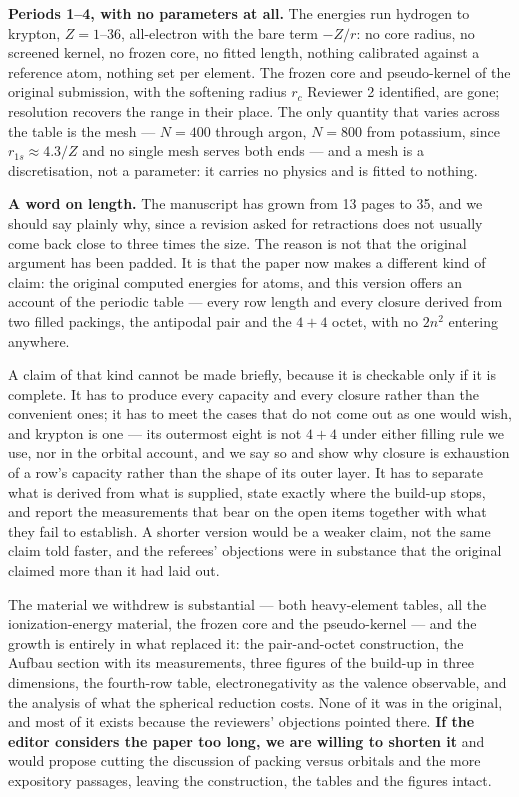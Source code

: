 \documentclass[11pt,a4paper]{article}
\begin{document}
\textbf{Periods 1--4, with no parameters at all.} The energies run hydrogen to krypton, $Z=1$--$36$,
all-electron with the bare term $-Z/r$: no core radius, no screened kernel, no frozen core, no fitted
length, nothing calibrated against a reference atom, nothing set per element. The frozen core and
pseudo-kernel of the original submission, with the softening radius $r_c$ Reviewer 2 identified, are
gone; resolution recovers the range in their place. The only quantity that varies across the table is
the mesh --- $N=400$ through argon, $N=800$ from potassium, since $r_{1s}\approx4.3/Z$ and no single
mesh serves both ends --- and a mesh is a discretisation, not a parameter: it carries no physics and is
fitted to nothing.

\textbf{A word on length.} The manuscript has grown from 13 pages to 35, and we should say plainly
why, since a revision asked for retractions does not usually come back close to three times the
size. The reason is not that the original argument has been padded. It is that the paper now makes
a different kind of claim: the original computed energies for atoms, and this version offers an
account of the periodic table --- every row length and every closure derived from two filled
packings, the antipodal pair and the $4{+}4$ octet, with no $2n^2$ entering anywhere.

A claim of that kind cannot be made briefly, because it is checkable only if it is complete. It has
to produce every capacity and every closure rather than the convenient ones; it has to meet the
cases that do not come out as one would wish, and krypton is one --- its outermost eight is not
$4{+}4$ under either filling rule we use, nor in the orbital account, and we say so and show why
closure is exhaustion of a row's capacity rather than the shape of its outer layer. It has to
separate what is derived from what is supplied, state exactly where the build-up stops, and report
the measurements that bear on the open items together with what they fail to establish. A shorter
version would be a weaker claim, not the same claim told faster, and the referees' objections were
in substance that the original claimed more than it had laid out.

The material we withdrew is substantial --- both heavy-element tables, all the ionization-energy
material, the frozen core and the pseudo-kernel --- and the growth is entirely in what replaced it: the
pair-and-octet construction, the Aufbau section with its measurements, three figures of the
build-up in three dimensions, the fourth-row table, electronegativity as the valence observable,
and the analysis of what the spherical reduction costs. None of it was in the original, and most of
it exists because the reviewers' objections pointed there. \textbf{If the editor considers the paper too
long, we are willing to shorten it} and would propose cutting the discussion of packing versus
orbitals and the more expository passages, leaving the construction, the tables and the figures
intact.
\end{document}
